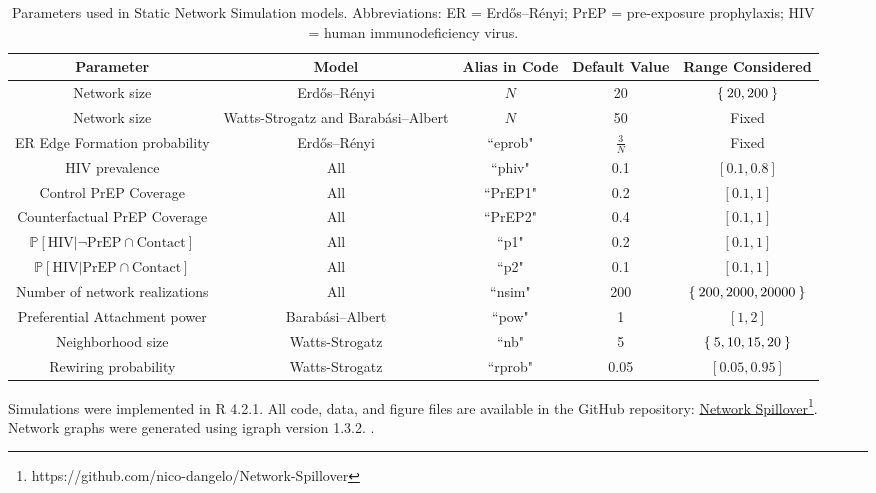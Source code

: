 \documentclass{article}
\theoremstyle{definition}
\begin{document}
\newpage
\begin{landscape}
\begin{table}[H]
    \centering
    \begin{tabular}{|c|c|c|c|c|}
    \hline
    \bf Parameter & \bf Model & \bf Alias in Code & \bf Default Value & \bf Range Considered  \\
    \hline
    Network size & Erdős–Rényi& $N$& 20 & $\Set{20,200}$\\
    \hline
    Network size & Watts-Strogatz and Barabási–Albert & $N$& 50 & Fixed \\
    \hline
    ER Edge Formation probability & Erdős–Rényi & ``eprob" & $\frac{3}{N}$ & Fixed \\
    \hline
    HIV prevalence & All & ``phiv" & 0.1 & $[0.1,0.8]$\\
    \hline
    Control PrEP Coverage & All & ``PrEP1" & 0.2 & $[0.1,1]$\\
    \hline
    Counterfactual PrEP Coverage & All & ``PrEP2" & 0.4 & $[0.1,1]$\\
    \hline
    $\mathbb{P}\left[\text{HIV} \vert \neg \text{PrEP} \cap \text{Contact}\right]$ & All & ``p1" & 0.2 & $[0.1,1]$\\
    \hline
    $\mathbb{P}\left[\text{HIV} \vert \text{PrEP} \cap \text{Contact}\right]$ & All & ``p2"  & 0.1 & $[0.1,1]$\\
    \hline
    Number of network realizations & All & ``nsim" & 200 & $\Set{200,2000,20000}$\\
    \hline
    Preferential Attachment power & Barabási–Albert& ``pow" & 1 & $\left[1,2 \right]$ \\
    \hline
    Neighborhood size & Watts-Strogatz & ``nb" & 5 & $\Set{5,10,15,20}$ \\
    \hline
    Rewiring probability & Watts-Strogatz &  ``rprob" & 0.05 &$\left[0.05, 0.95 \right]$ \\
    \hline
    \end{tabular}
    \caption{Parameters used in Static Network Simulation models. Abbreviations: ER = Erdős–Rényi; PrEP = pre-exposure prophylaxis; HIV = human immunodeficiency virus.}
    \label{tab:table1}
\end{table}
\end{landscape}
\newpage


Simulations were implemented in R 4.2.1. All code, data, and figure files are available in the GitHub repository: \href{https://github.com/nico-dangelo/Network-Spillover}{Network Spillover}\footnote{https://github.com/nico-dangelo/Network-Spillover}. Network graphs were generated using igraph version 1.3.2. \cite{csardi_igraph_2005}. 
\end{document}
